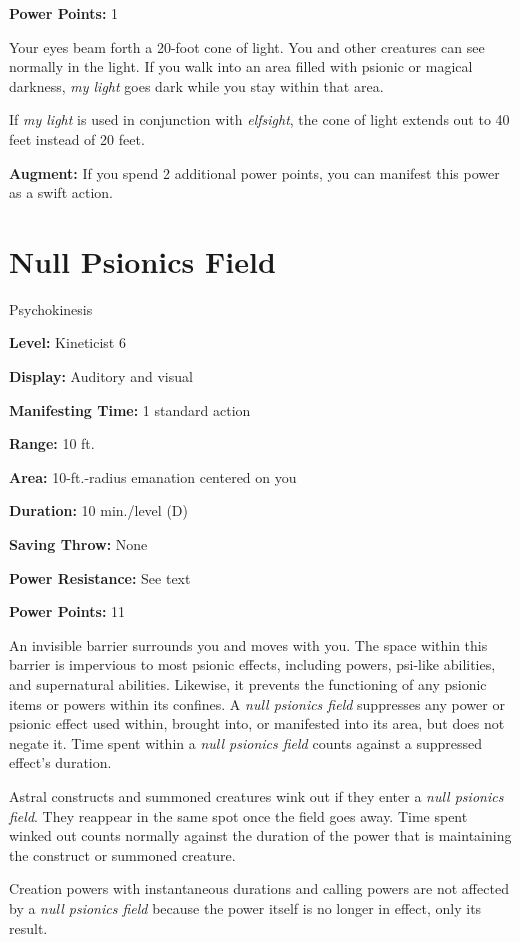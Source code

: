 \documentclass{article}
\begin{document}
\textbf{Power Points:} 1

Your eyes beam forth a 20-foot cone of light. You and other creatures can see normally 
in the light. If you walk into an area filled with psionic or magical darkness, 
\textit{my light }goes dark while you stay within that area.

If \textit{my light }is used in conjunction with \textit{elfsight}, the cone of 
light extends out to 40 feet instead of 20 feet.

\textbf{Augment:} If you spend 2 additional power points, you can manifest this 
power as a swift action.

\vspace{12pt}
\section*{Null Psionics Field}

Psychokinesis

\textbf{Level:} Kineticist 6

\textbf{Display:} Auditory and visual

\textbf{Manifesting Time:} 1 standard action

\textbf{Range:} 10 ft.

\textbf{Area:} 10-ft.-radius emanation centered on you

\textbf{Duration:} 10 min./level (D)

\textbf{Saving Throw:} None

\textbf{Power Resistance:} See text

\textbf{Power Points:} 11

An invisible barrier surrounds you and moves with you. The space within this barrier 
is impervious to most psionic effects, including powers, psi-like abilities, and 
supernatural abilities. Likewise, it prevents the functioning of any psionic items 
or powers within its confines. A \textit{null psionics field }suppresses any power 
or psionic effect used within, brought into, or manifested into its area, but does 
not negate it. Time spent within a \textit{null psionics field }counts against 
a suppressed effect's duration.

Astral constructs and summoned creatures wink out if they enter a \textit{null 
psionics field}. They reappear in the same spot once the field goes away. Time 
spent winked out counts normally against the duration of the power that is maintaining 
the construct or summoned creature.

Creation powers with instantaneous durations and calling powers are not affected 
by a \textit{null psionics field }because the power itself is no longer in effect, 
only its result.
\end{document}
